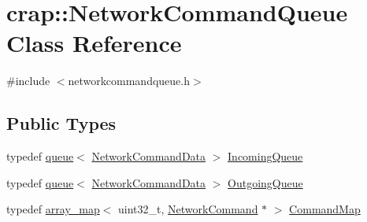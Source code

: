 \hypertarget{classcrap_1_1_network_command_queue}{}\section{crap\+:\+:Network\+Command\+Queue Class Reference}
\label{classcrap_1_1_network_command_queue}


{\ttfamily \#include $<$networkcommandqueue.\+h$>$}

\subsection*{Public Types}
\begin{DoxyCompactItemize}
\item 
typedef \hyperlink{classcrap_1_1queue}{queue}$<$ \hyperlink{structcrap_1_1_network_command_data}{Network\+Command\+Data} $>$ \hyperlink{classcrap_1_1_network_command_queue_af70b69ccb9dc80c2eb26ab25d7c3e6bc}{Incoming\+Queue}
\item 
typedef \hyperlink{classcrap_1_1queue}{queue}$<$ \hyperlink{structcrap_1_1_network_command_data}{Network\+Command\+Data} $>$ \hyperlink{classcrap_1_1_network_command_queue_a1e9973cba21e86ff5e49981e4d45c527}{Outgoing\+Queue}
\item 
typedef \hyperlink{classcrap_1_1array__map}{array\+\_\+map}$<$ uint32\+\_\+t, \hyperlink{classcrap_1_1_network_command}{Network\+Command} $\ast$ $>$ \hyperlink{classcrap_1_1_network_command_queue_a95baa8d1062378159d610e09d8eb8d09}{Command\+Map}
\end{DoxyCompactItemize}
